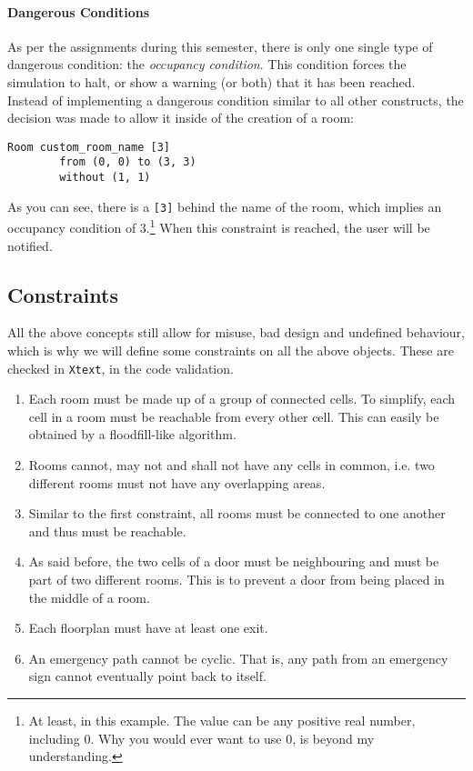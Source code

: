 \documentclass[review]{elsarticle}
\begin{document}
\paragraph{Dangerous Conditions} As per the assignments during this semester, there is only one single type of dangerous condition: the \emph{occupancy condition}. This condition forces the simulation to halt, or show a warning (or both) that it has been reached.\\
Instead of implementing a dangerous condition similar to all other constructs, the decision was made to allow it inside of the creation of a room:
\begin{lstlisting}[language=Bmod]
	Room custom_room_name [3]
		from (0, 0) to (3, 3)
		without (1, 1)
\end{lstlisting}
As you can see, there is a \texttt{[3]} behind the name of the room, which implies an occupancy condition of 3.\footnote{At least, in this example. The value can be any positive real number, including 0. Why you would ever want to use 0, is beyond my understanding.} When this constraint is reached, the user will be notified.

\subsection{Constraints}

All the above concepts still allow for misuse, bad design and undefined behaviour, which is why we will define some constraints on all the above objects. These are checked in \texttt{Xtext}, in the code validation.

\begin{enumerate}
	\item Each room must be made up of a group of \textsf{connected} cells. To simplify, each cell in a room must be reachable from every other cell. This can easily be obtained by a floodfill-like algorithm.
	\item Rooms cannot, may not and shall not have any cells in common, i.e. two different rooms must not have any overlapping areas.
	\item Similar to the first constraint, all rooms must be connected to one another and thus must be reachable.
	\item As said before, the two cells of a door must be neighbouring and must be part of two different rooms. This is to prevent a door from being placed in the middle of a room.
	\item Each floorplan must have at least one exit.
	\item An emergency path cannot be cyclic. That is, any path from an emergency sign cannot eventually point back to itself.
\end{enumerate}
\end{document}
